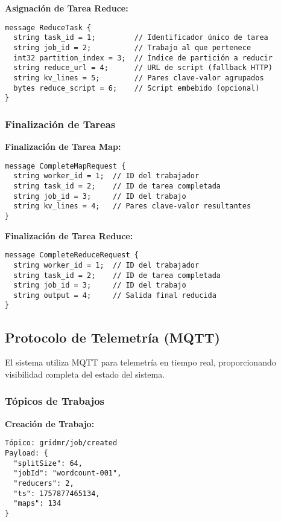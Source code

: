 \textbf{Asignación de Tarea Reduce:}
\begin{verbatim}
message ReduceTask {
  string task_id = 1;         // Identificador único de tarea
  string job_id = 2;          // Trabajo al que pertenece
  int32 partition_index = 3;  // Índice de partición a reducir
  string reduce_url = 4;      // URL de script (fallback HTTP)
  string kv_lines = 5;        // Pares clave-valor agrupados
  bytes reduce_script = 6;    // Script embebido (opcional)
}
\end{verbatim}

\subsubsection{Finalización de Tareas}

\textbf{Finalización de Tarea Map:}
\begin{verbatim}
message CompleteMapRequest {
  string worker_id = 1;  // ID del trabajador
  string task_id = 2;    // ID de tarea completada
  string job_id = 3;     // ID del trabajo
  string kv_lines = 4;   // Pares clave-valor resultantes
}
\end{verbatim}

\textbf{Finalización de Tarea Reduce:}
\begin{verbatim}
message CompleteReduceRequest {
  string worker_id = 1;  // ID del trabajador
  string task_id = 2;    // ID de tarea completada
  string job_id = 3;     // ID del trabajo
  string output = 4;     // Salida final reducida
}
\end{verbatim}

\subsection{Protocolo de Telemetría (MQTT)}

El sistema utiliza MQTT para telemetría en tiempo real, proporcionando visibilidad completa del estado del sistema.

\subsubsection{Tópicos de Trabajos}

\textbf{Creación de Trabajo:}
\begin{verbatim}
Tópico: gridmr/job/created
Payload: {
  "splitSize": 64,
  "jobId": "wordcount-001",
  "reducers": 2,
  "ts": 1757877465134,
  "maps": 134
}
\end{verbatim}


